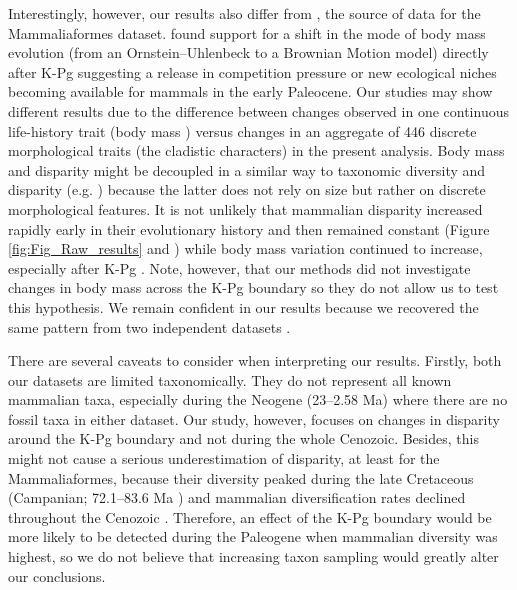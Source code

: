 \documentclass[10pt,letterpaper]{article}
\begin{document}
Interestingly, however, our results also differ from \cite{Slater2012MEE}, the source of data for the Mammaliaformes dataset.
\cite{Slater2012MEE} found support for a shift in the mode of body mass evolution (from an Ornstein--Uhlenbeck to a Brownian Motion model) directly after K-Pg suggesting a release in competition pressure or new ecological niches becoming available for mammals in the early Paleocene.
Our studies may show different results due to the difference between changes observed in one continuous life-history trait (body mass \cite{Slater2012MEE}) versus changes in an aggregate of 446 discrete morphological traits (the cladistic characters) in the present analysis.
Body mass and disparity might be decoupled in a similar way to taxonomic diversity and disparity (e.g. \cite{slaterCetacean,ruta2013,hopkinsdecoupling2013}) because the latter does not rely on size but rather on discrete morphological features.
It is not unlikely that mammalian disparity increased rapidly early in their evolutionary history and then remained constant (Figure \ref{fig:Fig_Raw_results} and \cite{Close2015,Lee2015R759}) while body mass variation continued to increase, especially after K-Pg \cite{Slater2012MEE}.
Note, however, that our methods did not investigate changes in body mass across the K-Pg boundary so they do not allow us to test this hypothesis.
We remain confident in our results because we recovered the same pattern from two independent datasets \cite{Slater2012MEE,beckancient2014}.

There are several caveats to consider when interpreting our results. 
Firstly, both our datasets are limited taxonomically.
They do not represent all known mammalian taxa, especially during the Neogene (23--2.58 Ma) where there are no fossil taxa in either dataset.
Our study, however, focuses on changes in disparity around the K-Pg boundary and not during the whole Cenozoic.
Besides, this might not cause a serious underestimation of disparity, at least for the Mammaliaformes, because their diversity peaked during the late Cretaceous (Campanian; 72.1--83.6 Ma \cite{Newham201432}) and mammalian diversification rates declined throughout the Cenozoic \cite{Raia2012}.
Therefore, an effect of the K-Pg boundary would be more likely to be detected during the Paleogene when mammalian diversity was highest, so we do not believe that increasing taxon sampling would greatly alter our conclusions.
\end{document}
